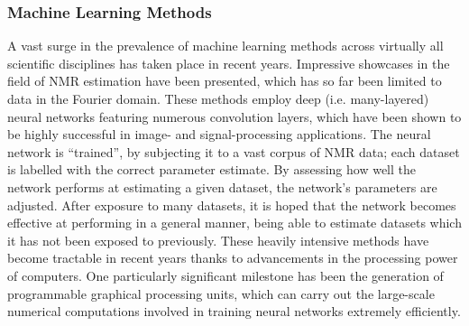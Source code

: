 \subsubsection{Machine Learning Methods}
A vast surge in the prevalence of machine learning methods across virtually
all scientific disciplines has taken place in recent years.
Impressive showcases in the field of \ac{NMR} estimation have been
presented, which has so far been limited to data in the
Fourier domain\cite{Li2021,Schmid2023}.
These methods employ deep (i.e. many-layered) neural
networks featuring numerous convolution layers, which have been shown to be
highly successful in image- and signal-processing applications\cite{Lecun1998}.
The neural network is ``trained'', by subjecting it to a vast corpus of
\ac{NMR} data; each dataset is labelled with the correct parameter
estimate. By assessing how well the network performs at estimating a given
dataset, the network's parameters are adjusted. After exposure to
many datasets, it is hoped that the network becomes
effective at performing in a general manner, being able to estimate datasets
which it has not been exposed to previously.
These heavily intensive methods have become tractable in recent years thanks to
advancements in the processing power of computers. One particularly significant
milestone has been the generation of programmable graphical processing
units, which can carry out the large-scale numerical computations involved in
training neural networks extremely efficiently.
